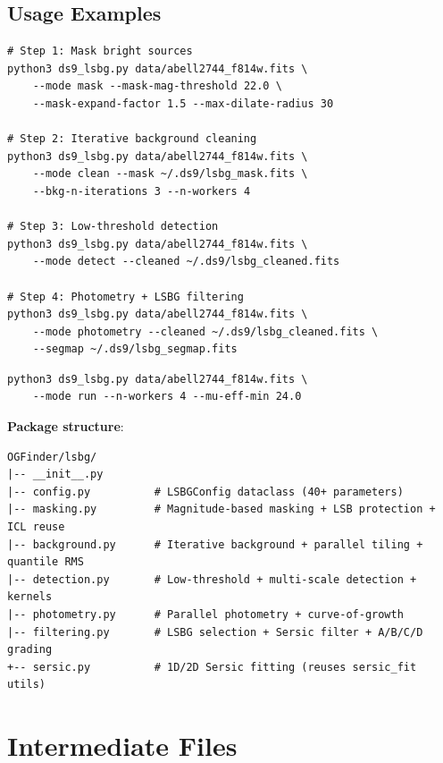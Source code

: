 \documentclass[11pt,fleqn]{book}
\begin{document}
\subsection{Usage Examples}

\begin{codebox}
\begin{lstlisting}[style=bash,numbers=none]
# Step 1: Mask bright sources
python3 ds9_lsbg.py data/abell2744_f814w.fits \
    --mode mask --mask-mag-threshold 22.0 \
    --mask-expand-factor 1.5 --max-dilate-radius 30

# Step 2: Iterative background cleaning
python3 ds9_lsbg.py data/abell2744_f814w.fits \
    --mode clean --mask ~/.ds9/lsbg_mask.fits \
    --bkg-n-iterations 3 --n-workers 4

# Step 3: Low-threshold detection
python3 ds9_lsbg.py data/abell2744_f814w.fits \
    --mode detect --cleaned ~/.ds9/lsbg_cleaned.fits

# Step 4: Photometry + LSBG filtering
python3 ds9_lsbg.py data/abell2744_f814w.fits \
    --mode photometry --cleaned ~/.ds9/lsbg_cleaned.fits \
    --segmap ~/.ds9/lsbg_segmap.fits
\end{lstlisting}
\end{codebox}

\begin{codebox}[Full pipeline (single command)]
\begin{lstlisting}[style=bash,numbers=none]
python3 ds9_lsbg.py data/abell2744_f814w.fits \
    --mode run --n-workers 4 --mu-eff-min 24.0
\end{lstlisting}
\end{codebox}

\textbf{Package structure}:
\begin{codebox}
\begin{lstlisting}[numbers=none]
OGFinder/lsbg/
|-- __init__.py
|-- config.py          # LSBGConfig dataclass (40+ parameters)
|-- masking.py         # Magnitude-based masking + LSB protection + ICL reuse
|-- background.py      # Iterative background + parallel tiling + quantile RMS
|-- detection.py       # Low-threshold + multi-scale detection + kernels
|-- photometry.py      # Parallel photometry + curve-of-growth
|-- filtering.py       # LSBG selection + Sersic filter + A/B/C/D grading
+-- sersic.py          # 1D/2D Sersic fitting (reuses sersic_fit utils)
\end{lstlisting}
\end{codebox}


\section{Intermediate Files}
\end{document}
